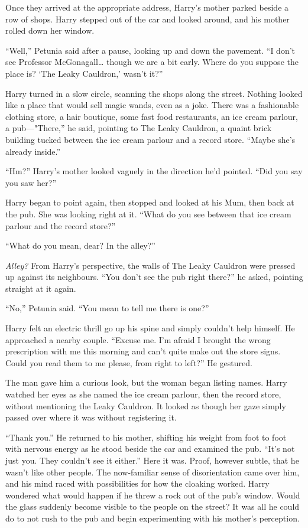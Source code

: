 Once they arrived at the appropriate address, Harry’s
mother parked beside a row of shops. Harry stepped out
of the car and looked around, and his mother rolled down
her window.

“Well,” Petunia said after a pause, looking up and down
the pavement. “I don’t see Professor McGonagall… though
we are a bit early. Where do you suppose the place is?
‘The Leaky Cauldron,’ wasn’t it?”

Harry turned in a slow circle, scanning the shops along the
street. Nothing looked like a place that would sell magic
wands, even as a joke. There was a fashionable clothing
store, a hair boutique, some fast food
restaurants, an ice cream parlour, a pub—"There,” he said,
pointing to The Leaky Cauldron, a quaint brick building
tucked between the ice cream parlour and a record store. “Maybe
she’s already inside.”

“Hm?” Harry’s mother looked vaguely in the direction he’d
pointed. “Did you say you saw her?”

Harry began to point again, then stopped and looked at
his Mum, then back at the pub. She was looking right at
it. “What do you see between that ice cream parlour and the
record store?”

“What do you mean, dear? In the alley?”

\emph{Alley?} From Harry’s perspective, the walls of The Leaky
Cauldron were pressed up against its neighbours. “You don’t
see the pub right there?” he asked, pointing straight at it
again.

“No,” Petunia said. “You mean to tell me there is one?”

Harry felt an electric thrill go up his spine and simply
couldn’t help himself. He approached a nearby couple.
“Excuse me. I’m afraid I brought
the wrong prescription with me this morning and can’t
quite make out the store signs. Could you read them to
me please, from right to left?” He gestured.

The man gave him a curious look, but the woman began
listing names. Harry watched her eyes as she named the
ice cream parlour, then the record store, without mentioning the
Leaky Cauldron. It looked as though her gaze simply
passed over where it was without registering it.

“Thank you.” He returned to his mother, shifting his weight
from foot to foot with nervous energy as he stood beside
the car and examined the pub. “It’s not just you. They
couldn’t see it either.” Here it was. Proof, however subtle,
that he wasn’t like other people. The now-familiar sense of
disorientation came over him, and his mind raced with
possibilities for how the cloaking worked. Harry wondered
what would happen if he threw a rock out of the pub’s
window. Would the glass suddenly become visible to the
people on the street? It was all he could do to not rush
to the pub and begin experimenting with his mother’s
perception.

